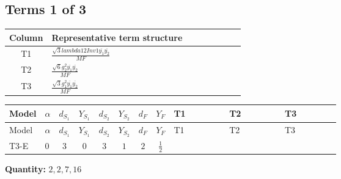 \documentclass[8pt]{article}
\begin{document}
\begin{landscape}
\subsection*{Terms 1 of 3}
\begin{center}
\begin{tabular}{@{}c >{\raggedright\arraybackslash}p{0.82\linewidth}@{}}
\toprule
Column & Representative term structure \\
\midrule
T1 & \(\displaystyle \frac{\sqrt{3} lambda12Inv1 \overline{y_{1}} \overline{y_{2}}}{MF}\) \\
\midrule
T2 & \(\displaystyle \frac{\sqrt{6} g_{2}^{2} \overline{y_{1}} \overline{y_{2}}}{MF}\) \\
\midrule
T3 & \(\displaystyle \frac{\sqrt{3} g_{1}^{2} \overline{y_{1}} \overline{y_{2}}}{MF}\) \\
\midrule
\bottomrule
\end{tabular}
\end{center}
\smallskip
\tiny
\begin{longtable}{@{}llcccccc >{\raggedright\arraybackslash}p{0.21\linewidth} >{\raggedright\arraybackslash}p{0.21\linewidth} >{\raggedright\arraybackslash}p{0.21\linewidth}@{}}
\toprule
Model & $\alpha$ & $d_{S_1}$ & $Y_{S_1}$ & $d_{S_2}$ & $Y_{S_2}$ & $d_F$ & $Y_F$ & T1 & T2 & T3 \\
\midrule
\endfirsthead
\toprule
Model & $\alpha$ & $d_{S_1}$ & $Y_{S_1}$ & $d_{S_2}$ & $Y_{S_2}$ & $d_F$ & $Y_F$ & T1 & T2 & T3 \\
\midrule
\endhead
T3-E & $0$ & $3$ & $0$ & $3$ & $1$ & $2$ & $\frac{1}{2}$ & \scriptsize\adjustbox{max width=\linewidth}{$\begin{gathered} - \frac{\sqrt{3} lambda12Inv1 \overline{y_{1}} \overline{y_{2}}}{6 MF}\end{gathered}$} & \scriptsize\adjustbox{max width=\linewidth}{$\begin{gathered} \frac{\sqrt{6} g_{2}^{2} \overline{y_{1}} \overline{y_{2}}}{3 MF}\end{gathered}$} & \scriptsize\adjustbox{max width=\linewidth}{$\begin{gathered} \frac{\sqrt{3} g_{1}^{2} \overline{y_{1}} \overline{y_{2}}}{8 MF}\end{gathered}$} \\
\midrule
\bottomrule
\end{longtable}
\clearpage
\noindent\textbf{Quantity: }$\mathrm{2,2,7,16}$\par\smallskip

\end{landscape}
\end{document}
